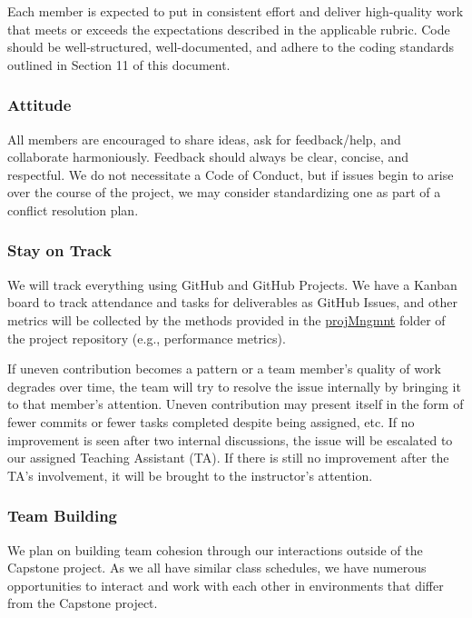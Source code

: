 \documentclass{article}
\begin{document}
\noindent Each member is expected to put in consistent effort and deliver high-quality work
that meets or exceeds the expectations described in the applicable rubric. Code
should be well-structured, well-documented, and adhere to the coding standards
outlined in Section 11 of this document.

\subsubsection*{Attitude}

All members are encouraged to share ideas, ask for feedback/help, and collaborate
harmoniously. Feedback should always be clear, concise, and respectful. We do not
necessitate a Code of Conduct, but if issues begin to arise over the course of the
project, we may consider standardizing one as part of a conflict resolution plan.

\subsubsection*{Stay on Track}

We will track everything using GitHub and GitHub Projects. We have a Kanban board to
track attendance and tasks for deliverables as GitHub Issues, and other
metrics will be collected by the methods provided in the \href{https://github.com/SumanyaG/Alkalytics/tree/main/docs/projMngmnt}{projMngmnt}
folder of the project repository (e.g., performance metrics).\newline

\noindent If uneven contribution becomes a pattern or a team member’s quality of work degrades
over time, the team will try to resolve the issue internally by bringing it to that
member’s attention. Uneven contribution may present itself in the form of fewer
commits or fewer tasks completed despite being assigned, etc. If no improvement is
seen after two internal discussions, the issue will be escalated to our assigned
Teaching Assistant (TA). If there is still no improvement after the TA's involvement,
it will be brought to the instructor's attention.

\subsubsection*{Team Building}

We plan on building team cohesion through our interactions outside of the Capstone
project. As we all have similar class schedules, we have numerous opportunities to
interact and work with each other in environments that differ from the Capstone
project. 
\end{document}
